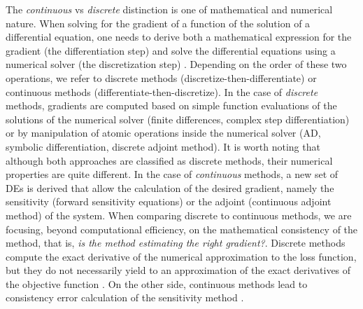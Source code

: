 The \textit{continuous} vs \textit{discrete} distinction is one of mathematical and numerical nature. 
When solving for the gradient of a function of the solution of a differential equation, one needs to derive both a mathematical expression for the gradient (the differentiation step) and solve the differential equations using a numerical solver (the discretization step) \cite{bradley2013pde, Onken_Ruthotto_2020, FATODE2014, Sirkes_Tziperman_1997}. 
Depending on the order of these two operations, we refer to discrete methods (discretize-then-differentiate) or continuous methods (differentiate-then-discretize). 
In the case of \textit{discrete} methods, gradients are computed based on simple function evaluations of the solutions of the numerical solver (finite differences, complex step differentiation) or by manipulation of atomic operations inside the numerical solver (AD, symbolic differentiation, discrete adjoint method). 
It is worth noting that although both approaches are classified as discrete methods, their numerical properties are quite different.
In the case of \textit{continuous} methods, a new set of DEs is derived that allow the calculation of the desired gradient, namely the sensitivity (forward sensitivity equations) or the adjoint (continuous adjoint method) of the system.   
When comparing discrete to continuous methods, we are focusing, beyond computational efficiency, on the mathematical consistency of the method, that is, \textit{is the method estimating the right gradient?}. 
Discrete methods compute the exact derivative of the numerical approximation to the loss function, but they do not necessarily yield to an approximation of the exact derivatives of the objective function \cite{Eberhard_Bischof_1996, Walther_2007}. 
On the other side, continuous methods lead to consistency error calculation of the sensitivity method \cite{Keulen_Haftka_Kim_2005}. 

